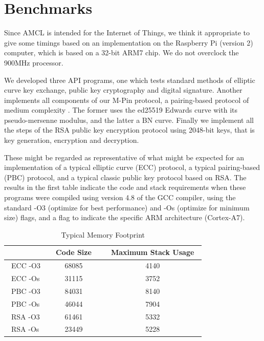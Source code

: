 \documentclass{llncs}
\begin{document}



\appendix

\section*{Benchmarks}

Since AMCL is intended for the Internet of Things, we think it appropriate to give some timings based on an implementation on the Raspberry Pi (version 2) computer, which is
based on a 32-bit ARM7 chip. We do not overclock the 900MHz processor. 

We developed three API programs, one which tests standard methods of elliptic curve key exchange, public key cryptography and digital signature. Another implements all components of our M-Pin protocol,
a pairing-based protocol of medium complexity \cite{mpin}.  The former uses the ed25519 Edwards curve \cite{bernstein-duif-lange-schwabe-yang} with its pseudo-mersenne modulus, and the latter a BN curve.
Finally we implement all the steps of the RSA public key encryption protocol using 2048-bit keys, that is key generation, encryption and decryption.

These might be regarded as representative of what might be expected for an implementation of a typical elliptic curve (ECC) protocol, a typical pairing-based (PBC) protocol, and a typical classic 
public key protocol based on RSA.
The results in the first table indicate the code and stack requirements when these programs were compiled using version 4.8 of the GCC compiler, using the standard  -O3 (optimize for best performance) and -Os
(optimize for minimum size) flags, and a flag to indicate the specific ARM architecture (Cortex-A7).


\begin{table}
\centering
\begin{tabular}{|l|c|c|}
\hline
&~~Code Size~~&~Maximum Stack Usage~\\
\hline
~ECC  -O3 & 68085 & 4140  \\  %
~ECC  -Os & 31115 & 3752 \\   %
~PBC  -O3 & 84031 & 8140 \\   %
~PBC  -Os & 46044 & 7904 \\   %
~RSA  -O3 & 61461 & 5332 \\   %
~RSA  -Os & 23449 & 5228 \\   %
\hline
\end{tabular}
~\\
\caption{Typical Memory Footprint}
\label{footprint}
\end{table}
\end{document}
